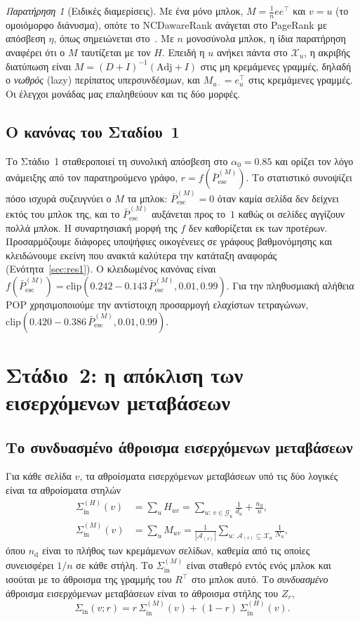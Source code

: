 \documentclass[11pt,a4paper]{article}
\theoremstyle{definition}
\theoremstyle{remark}
\newtheorem{remark}{Παρατήρηση}
\newcommand{\Pbar}{\bar P^{(M)}_{\mathrm{esc}}}
\newcommand{\Sin}{\Sigma_{\mathrm{in}}}
\newcommand{\clip}{\mathrm{clip}}
\begin{document}
\begin{remark}[Ειδικές διαμερίσεις]\label{rem:remark1}
Με ένα μόνο μπλοκ, $M=\frac1n ee^\top$ και $v=u$ (το ομοιόμορφο διάνυσμα), οπότε το NCDawareRank
ανάγεται στο PageRank με απόσβεση $\eta$, όπως σημειώνεται στο~\cite[Παρατήρηση~1]{ng13}. Με $n$
μονοσύνολα μπλοκ, η ίδια παρατήρηση αναφέρει ότι ο $M$ ταυτίζεται με τον $H$. Επειδή η $u$ ανήκει πάντα
στο $\mathcal X_u$, η ακριβής διατύπωση είναι $M=(D+I)^{-1}(\mathrm{Adj}+I)$ στις μη κρεμάμενες γραμμές,
δηλαδή ο \emph{νωθρός} (lazy) περίπατος υπερσυνδέσμων, και $M_{u\cdot}=e_u^\top$ στις κρεμάμενες
γραμμές. Οι έλεγχοι μονάδας μας επαληθεύουν και τις δύο μορφές.
\end{remark}

\subsection{Ο κανόνας του Σταδίου~1}
Το Στάδιο~1 σταθεροποιεί τη συνολική απόσβεση στο $\alpha_0=0.85$ και ορίζει τον λόγο ανάμειξης από
τον παρατηρούμενο γράφο, $r=f(\Pbar)$. Το στατιστικό συνοψίζει πόσο ισχυρά συζευγνύει ο $M$ τα μπλοκ:
$\Pbar=0$ όταν καμία σελίδα δεν δείχνει εκτός του μπλοκ της, και το $\Pbar$ αυξάνεται προς το~$1$
καθώς οι σελίδες αγγίζουν πολλά μπλοκ. Η συναρτησιακή μορφή της $f$ δεν καθορίζεται εκ των προτέρων.
Προσαρμόζουμε διάφορες υποψήφιες οικογένειες σε γράφους βαθμονόμησης και κλειδώνουμε εκείνη που ανακτά
καλύτερα την κατάταξη αναφοράς (Ενότητα~\ref{sec:res1}). Ο κλειδωμένος κανόνας είναι
$f(\Pbar)=\clip(0.242-0.143\,\Pbar,0.01,0.99)$. Για την πληθυσμιακή αλήθεια POP χρησιμοποιούμε την
αντίστοιχη προσαρμογή ελαχίστων τετραγώνων, $\clip(0.420-0.386\,\Pbar,0.01,0.99)$.

\section{Στάδιο~2: η απόκλιση των εισερχόμενων μεταβάσεων}
\label{sec:stage2}

\subsection{Το συνδυασμένο άθροισμα εισερχόμενων μεταβάσεων}
Για κάθε σελίδα $v$, τα αθροίσματα εισερχόμενων μεταβάσεων υπό τις δύο λογικές είναι τα αθροίσματα
στηλών
\begin{align}
\Sin^{(H)}(v)&=\sum_{u}H_{uv}=\sum_{u:\,v\in\mathcal G_u}\frac{1}{d_u}+\frac{n_{\mathrm d}}{n},
\label{eq:sinh}\\
\Sin^{(M)}(v)&=\sum_u M_{uv}=\frac{1}{|\mathcal A_{(v)}|}\sum_{u:\,\mathcal A_{(v)}\subseteq\mathcal X_u}\frac{1}{N_u},
\label{eq:sinm}
\end{align}
όπου $n_{\mathrm d}$ είναι το πλήθος των κρεμάμενων σελίδων, καθεμία από τις οποίες συνεισφέρει $1/n$
σε κάθε στήλη. Το $\Sin^{(M)}$ είναι σταθερό εντός ενός μπλοκ και ισούται με το άθροισμα της γραμμής
του $R^\top$ στο μπλοκ αυτό. Το \emph{συνδυασμένο} άθροισμα εισερχόμενων μεταβάσεων είναι το άθροισμα
στήλης του $Z_r$,
\begin{equation}
\Sin(v;r)=r\,\Sin^{(M)}(v)+(1-r)\,\Sin^{(H)}(v).
\label{eq:sin}
\end{equation}
\end{document}
